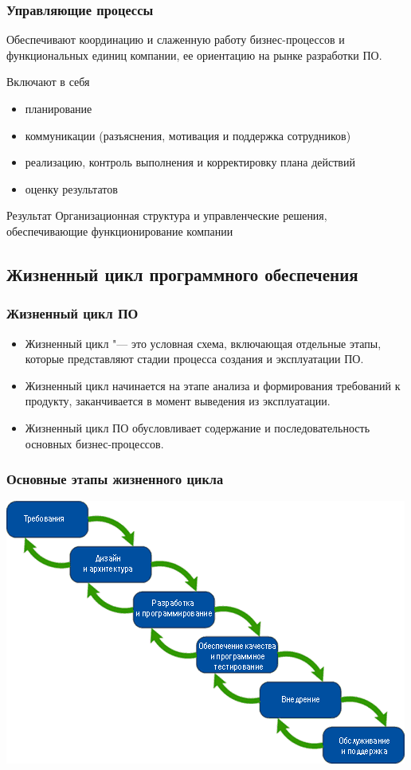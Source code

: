 \documentclass{../industrial-development}
\begin{document}
\begin{frame} \frametitle{Управляющие процессы}
	Обеспечивают координацию и слаженную работу бизнес-процессов и функциональных единиц компании, ее ориентацию на рынке разработки ПО.
	
	\begin{block}{Включают в себя}
		\begin{itemize}
		\item планирование
		\item коммуникации (разъяснения, мотивация и поддержка сотрудников)
		\item реализацию, контроль выполнения и корректировку плана действий
		\item оценку результатов
		\end{itemize}
	\end{block}
	\begin{block}{Результат}
		Организационная структура и управленческие решения, обеспечивающие функционирование компании
	\end{block}
\end{frame}
\lecturenotes


\subsection{Жизненный цикл программного обеспечения}


\begin{frame} \frametitle{Жизненный цикл ПО}
	\begin{itemize}
		\item Жизненный цикл "--- это условная схема, включающая отдельные этапы, которые представляют стадии процесса создания и эксплуатации ПО.
		\item Жизненный цикл начинается на этапе анализа и формирования требований к продукту, заканчивается в момент выведения из эксплуатации.
		\item Жизненный цикл ПО обусловливает содержание и последовательность основных бизнес-процессов.
	\end{itemize}
\end{frame}
\lecturenotes


\begin{frame} \frametitle{Основные этапы жизненного цикла}
	\centerline{\includegraphics[height=0.70\textheight]{image15.png}}	
\end{frame}
\lecturenotes
\end{document}
